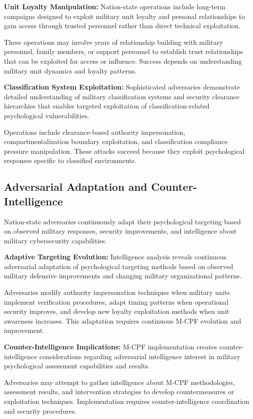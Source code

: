 \documentclass[10pt, twocolumn]{article}
\begin{document}
\textbf{Unit Loyalty Manipulation:} Nation-state operations include long-term campaigns designed to exploit military unit loyalty and personal relationships to gain access through trusted personnel rather than direct technical exploitation.

These operations may involve years of relationship building with military personnel, family members, or support personnel to establish trust relationships that can be exploited for access or influence. Success depends on understanding military unit dynamics and loyalty patterns.

\textbf{Classification System Exploitation:} Sophisticated adversaries demonstrate detailed understanding of military classification systems and security clearance hierarchies that enables targeted exploitation of classification-related psychological vulnerabilities.

Operations include clearance-based authority impersonation, compartmentalization boundary exploitation, and classification compliance pressure manipulation. These attacks succeed because they exploit psychological responses specific to classified environments.

\subsection{Adversarial Adaptation and Counter-Intelligence}

Nation-state adversaries continuously adapt their psychological targeting based on observed military responses, security improvements, and intelligence about military cybersecurity capabilities.

\textbf{Adaptive Targeting Evolution:} Intelligence analysis reveals continuous adversarial adaptation of psychological targeting methods based on observed military defensive improvements and changing military organizational patterns.

Adversaries modify authority impersonation techniques when military units implement verification procedures, adapt timing patterns when operational security improves, and develop new loyalty exploitation methods when unit awareness increases. This adaptation requires continuous M-CPF evolution and improvement.

\textbf{Counter-Intelligence Implications:} M-CPF implementation creates counter-intelligence considerations regarding adversarial intelligence interest in military psychological assessment capabilities and results.

Adversaries may attempt to gather intelligence about M-CPF methodologies, assessment results, and intervention strategies to develop countermeasures or exploitation techniques. Implementation requires counter-intelligence coordination and security procedures.
\end{document}
